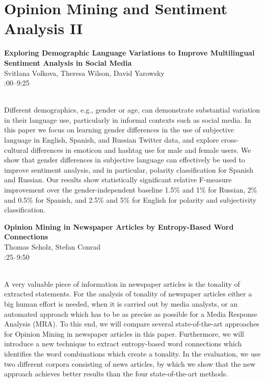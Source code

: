 \documentclass[twoside,makeidx]{book}
\renewcommand{\normalsize}{\fontsize{8}{9}\selectfont}
\renewcommand{\small}{\fontsize{7}{8}\selectfont}
\begin{document}
\section{Opinion Mining and Sentiment Analysis II}
\vspace{-1em}
\par\vspace{2em}\noindent%
\begin{minipage}{\linewidth}%
\begin{center}
\textbf{\normalsize Exploring Demographic Language Variations to Improve Multilingual Sentiment Analysis in Social Media}\\
\normalsize  Svitlana Volkova,  Theresa Wilson,  David Yarowsky\\
{\small 9:00--9:25}\\
\end{center}
\end{minipage}\\[0.5em]
\nopagebreak%
\noindent%
{\small Different demographics, e.g., gender or age, can demonstrate substantial variation in their language use, particularly in informal contexts such as social media. In this paper we focus on learning gender differences in the use of subjective language in English, Spanish, and Russian Twitter data, and explore cross-cultural differences in emoticon and hashtag use for male and female users. We show that gender differences in subjective language can effectively be used to improve sentiment analysis, and in particular, polarity classification for Spanish and Russian. Our results show statistically significant relative F-measure improvement over the gender-independent baseline 1.5\% and 1\% for Russian, 2\% and 0.5\% for Spanish, and 2.5\% and 5\% for English for polarity and subjectivity classification.}
\par\vspace{2em}\noindent%
\begin{minipage}{\linewidth}%
\begin{center}
\textbf{\normalsize Opinion Mining in Newspaper Articles by Entropy-Based Word Connections}\\
\normalsize  Thomas Scholz,  Stefan Conrad\\
{\small 9:25--9:50}\\
\end{center}
\end{minipage}\\[0.5em]
\nopagebreak%
\noindent%
{\small A very valuable piece of information in newspaper articles is the tonality of extracted statements. For the analysis of tonality of newspaper articles either a big human effort is needed, when it is carried out by media analysts, or an automated approach which has to be as precise as possible for a Media Response Analysis (MRA). To this end, we will compare several state-of-the-art approaches for Opinion Mining in newspaper articles in this paper. Furthermore, we will introduce a new technique to extract entropy-based word connections which identifies the word combinations which create a tonality. In the evaluation, we use two different corpora consisting of news articles, by which we show that the new approach achieves better results than the four state-of-the-art methods.}
\end{document}
